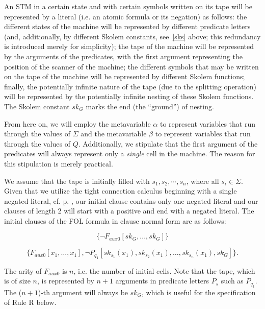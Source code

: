\documentclass[%
  manuscript=article,   %
  year=2024,
  volume=77,
  doi=10.59203/zfn.77.694,
]{zfn}
\begin{document}
An STM in a certain state and with certain symbols written on its tape will be represented by a literal (i.e. an atomic formula or its negation) as follows: the different states of the machine will be represented by different predicate letters (and, additionally, by different Skolem constants, see~\ref{sks} above; this redundancy is introduced merely for simplicity); the tape of the machine will be represented by the arguments of the predicates, with the first argument representing the position of the scanner of the machine; the different symbols that may be written on the tape of the machine will be represented by different Skolem functions; finally, the potentially infinite nature of the tape (due to the splitting operation) will be represented by the potentially infinite nesting of these Skolem functions. The Skolem constant $sk_G$ marks the end (the ``ground'') of nesting.

From here on, we will employ the metavariable $\alpha$ to represent variables that run through the values of $\Sigma$ and the metavariable $\beta$ to represent variables that run through the values of $Q$. Additionally, we stipulate that the first argument of the predicates will always represent only a \textit{single} cell in the machine. The reason for this stipulation is merely practical.

We assume that the tape is initially filled with $s_1, s_2,\cdots, s_n$, where all $s_i\in\Sigma$. 
Given that we utilize the tight connection calculus beginning with a single negated literal, cf. p. \pageref{onenegative}, our initial clause contains only one negated literal and our clauses of length 2 will start with a positive and end with a negated literal.
The initial clauses of the FOL formula in clause normal form are as follows:

\begin{equation}
\{\neg F_{aux0}[sk_G, ..., sk_G]\} \label{ini1}
\end{equation}

\begin{equation}
\{F_{aux0}[x_1, \ldots, x_1], \neg P_{q_1}[sk_{s_1}(x_1), sk_{s_2}(x_1), \ldots, sk_{s_n}(x_1), sk_G]\}. \label{ini2}
\end{equation}

The arity of $F_{aux0}$ is $n$, i.e. the number of initial cells.
Note that the tape, which is of size $n$, is represented by $n+1$ arguments in predicate letters $P_s$ such as $P_{q_1}$.
The ($n+1$)-th argument will always be $sk_G$, which is useful for the specification of Rule R below.
\end{document}
